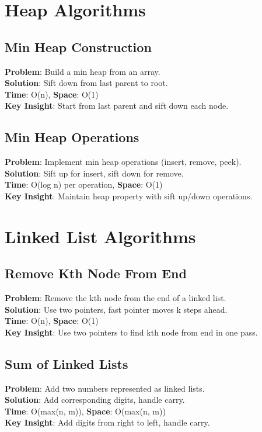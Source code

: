 \documentclass{report}
\begin{document}
\section{Heap Algorithms}

\subsection{Min Heap Construction}
\textbf{Problem}: Build a min heap from an array.\\
\textbf{Solution}: Sift down from last parent to root.\\
\textbf{Time}: O(n), \textbf{Space}: O(1)\\
\textbf{Key Insight}: Start from last parent and sift down each node.

\subsection{Min Heap Operations}
\textbf{Problem}: Implement min heap operations (insert, remove, peek).\\
\textbf{Solution}: Sift up for insert, sift down for remove.\\
\textbf{Time}: O(log n) per operation, \textbf{Space}: O(1)\\
\textbf{Key Insight}: Maintain heap property with sift up/down operations.

\section{Linked List Algorithms}

\subsection{Remove Kth Node From End}
\textbf{Problem}: Remove the kth node from the end of a linked list.\\
\textbf{Solution}: Use two pointers, fast pointer moves k steps ahead.\\
\textbf{Time}: O(n), \textbf{Space}: O(1)\\
\textbf{Key Insight}: Use two pointers to find kth node from end in one pass.

\subsection{Sum of Linked Lists}
\textbf{Problem}: Add two numbers represented as linked lists.\\
\textbf{Solution}: Add corresponding digits, handle carry.\\
\textbf{Time}: O(max(n, m)), \textbf{Space}: O(max(n, m))\\
\textbf{Key Insight}: Add digits from right to left, handle carry.
\end{document}
